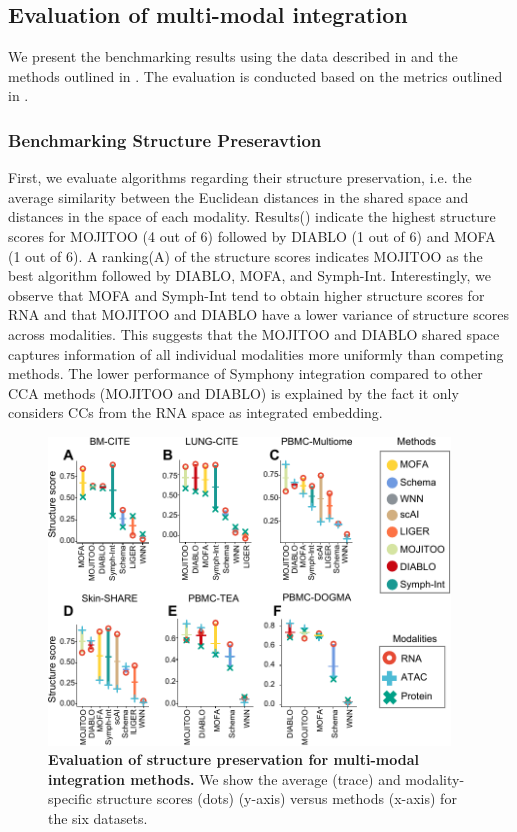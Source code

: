 \subsection{Evaluation of multi-modal integration}
We present the benchmarking results using the data described in  and the methods outlined in . The evaluation is conducted based on the metrics outlined in .

\subsubsection{Benchmarking Structure Preseravtion}
First, we evaluate algorithms regarding their structure preservation, i.e. the average similarity between the Euclidean distances in the shared space and distances in the space of each modality\citep{jain2021multimap}. Results() indicate the highest structure scores for MOJITOO (4 out of 6) followed by DIABLO (1 out of 6) and MOFA (1 out of 6). A ranking(A) of the structure scores indicates MOJITOO as the best algorithm followed by DIABLO, MOFA, and Symph-Int. Interestingly, we observe that MOFA and Symph-Int tend to obtain higher structure scores for RNA and that MOJITOO and DIABLO have a lower variance of structure scores across modalities. This suggests that the MOJITOO and DIABLO shared space captures information of all individual modalities more uniformly than competing methods. The lower performance of Symphony integration compared to other CCA methods (MOJITOO and DIABLO) is explained by the fact it only considers CCs from the RNA space as integrated embedding.
\begin{figure}[!ht]
	\centering
	\includegraphics[width=0.95\textwidth]{structure/fig}
	\vspace{0.1cm}
	\caption[Evaluation of structure preservation for multi-modal integration methods.]{
	\textbf{Evaluation of structure preservation for multi-modal integration methods.}  We show the average (trace) and modality-specific structure scores (dots) (y-axis) versus methods (x-axis) for the six datasets.}
	\label{fig:structure}
\end{figure}

